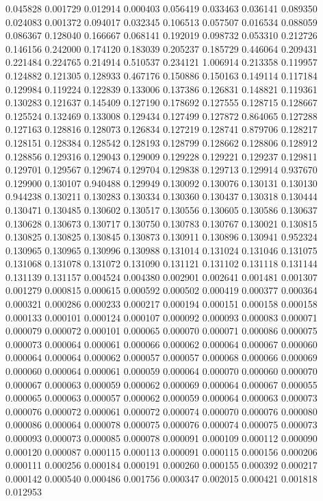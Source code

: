 0.045828
0.001729
0.012914
0.000403
0.056419
0.033463
0.036141
0.089350
0.024083
0.001372
0.094017
0.032345
0.106513
0.057507
0.016534
0.088059
0.086367
0.128040
0.166667
0.068141
0.192019
0.098732
0.053310
0.212726
0.146156
0.242000
0.174120
0.183039
0.205237
0.185729
0.446064
0.209431
0.221484
0.224765
0.214914
0.510537
0.234121
1.006914
0.213358
0.119957
0.124882
0.121305
0.128933
0.467176
0.150886
0.150163
0.149114
0.117184
0.129984
0.119224
0.122839
0.133006
0.137386
0.126831
0.148821
0.119361
0.130283
0.121637
0.145409
0.127190
0.178692
0.127555
0.128715
0.128667
0.125524
0.132469
0.133008
0.129434
0.127499
0.127872
0.864065
0.127288
0.127163
0.128816
0.128073
0.126834
0.127219
0.128741
0.879706
0.128217
0.128151
0.128384
0.128542
0.128193
0.128799
0.128662
0.128806
0.128912
0.128856
0.129316
0.129043
0.129009
0.129228
0.129221
0.129237
0.129811
0.129701
0.129567
0.129674
0.129704
0.129838
0.129713
0.129914
0.937670
0.129900
0.130107
0.940488
0.129949
0.130092
0.130076
0.130131
0.130130
0.944238
0.130211
0.130283
0.130334
0.130360
0.130437
0.130318
0.130444
0.130471
0.130485
0.130602
0.130517
0.130556
0.130605
0.130586
0.130637
0.130628
0.130673
0.130717
0.130750
0.130783
0.130767
0.130021
0.130815
0.130825
0.130825
0.130845
0.130873
0.130911
0.130896
0.130941
0.952324
0.130965
0.130965
0.130996
0.130988
0.131014
0.131024
0.131046
0.131075
0.131068
0.131078
0.131072
0.131090
0.131121
0.131102
0.131118
0.131144
0.131139
0.131157
0.004524
0.004380
0.002901
0.002641
0.001481
0.001307
0.001279
0.000815
0.000615
0.000592
0.000502
0.000419
0.000377
0.000364
0.000321
0.000286
0.000233
0.000217
0.000194
0.000151
0.000158
0.000158
0.000133
0.000101
0.000124
0.000107
0.000092
0.000093
0.000083
0.000071
0.000079
0.000072
0.000101
0.000065
0.000070
0.000071
0.000086
0.000075
0.000073
0.000064
0.000061
0.000066
0.000062
0.000064
0.000067
0.000060
0.000064
0.000064
0.000062
0.000057
0.000057
0.000068
0.000066
0.000069
0.000060
0.000064
0.000061
0.000059
0.000064
0.000070
0.000060
0.000070
0.000067
0.000063
0.000059
0.000062
0.000069
0.000064
0.000067
0.000055
0.000065
0.000063
0.000057
0.000062
0.000059
0.000064
0.000063
0.000073
0.000076
0.000072
0.000061
0.000072
0.000074
0.000070
0.000076
0.000080
0.000086
0.000064
0.000078
0.000075
0.000076
0.000074
0.000075
0.000073
0.000093
0.000073
0.000085
0.000078
0.000091
0.000109
0.000112
0.000090
0.000120
0.000087
0.000115
0.000113
0.000091
0.000115
0.000156
0.000206
0.000111
0.000256
0.000184
0.000191
0.000260
0.000155
0.000392
0.000217
0.000142
0.000540
0.000486
0.001756
0.000347
0.002015
0.000421
0.001818
0.012953

